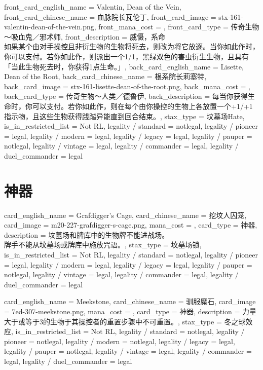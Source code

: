 \documentclass[lang = cn, color = black, 10pt]{AllThatStax}
\begin{document}
\mfcard
{
	front_card_english_name = {Valentin, Dean of the Vein},
	front_card_chinese_name = {血脉院长瓦伦丁},
	front_card_image = stx-161-valentin-dean-of-the-vein.png,
	front_mana_cost = ,
	front_card_type = 传奇生物～吸血鬼／邪术师,
	front_description = {威慑，系命\\
如果某个由对手操控且非衍生物的生物将死去，则改为将它放逐。当你如此作时，你可以支付。若你如此作，则派出一个1/1，黑绿双色的害虫衍生生物，且具有「当此生物死去时，你获得1点生命。」},
	back_card_english_name = {Lisette, Dean of the Root},
	back_card_chinese_name = {根系院长莉塞特},
	back_card_image = stx-161-lisette-dean-of-the-root.png,
	back_mana_cost = ,
	back_card_type = 传奇生物～人类／德鲁伊,
	back_description = {每当你获得生命时，你可以支付。若你如此作，则在每个由你操控的生物上各放置一个+1/+1指示物，且这些生物获得践踏异能直到回合结束。},
	stax_type = 坟墓场Hate,
	is_in_restricted_list = Not RL,
	legality / standard = notlegal,
	legality / pioneer = legal,
	legality / modern = legal,
	legality / legacy = legal,
	legality / pauper = notlegal,
	legality / vintage = legal,
	legality / commander = legal,
	legality / duel_commander = legal
}

\section{神器}

\card
{
	card_english_name = {Grafdigger's Cage},
	card_chinese_name = {挖坟人囚笼},
	card_image = m20-227-grafdigger-s-cage.png,
	mana_cost = ,
	card_type = 神器,
	description = {坟墓场和牌库中的生物牌不能进战场。\\
牌手不能从坟墓场或牌库中施放咒语。},
	stax_type = 坟墓场锁,
	is_in_restricted_list = Not RL,
	legality / standard = notlegal,
	legality / pioneer = legal,
	legality / modern = legal,
	legality / legacy = legal,
	legality / pauper = notlegal,
	legality / vintage = legal,
	legality / commander = legal,
	legality / duel_commander = legal
}

\card
{
	card_english_name = {Meekstone},
	card_chinese_name = {驯服魔石},
	card_image = 7ed-307-meekstone.png,
	mana_cost = ,
	card_type = 神器,
	description = {力量大于或等于3的生物于其操控者的重置步骤中不可重置。},
	stax_type = 冬之球效应,
	is_in_restricted_list = Not RL,
	legality / standard = notlegal,
	legality / pioneer = notlegal,
	legality / modern = notlegal,
	legality / legacy = legal,
	legality / pauper = notlegal,
	legality / vintage = legal,
	legality / commander = legal,
	legality / duel_commander = legal
}
\end{document}
